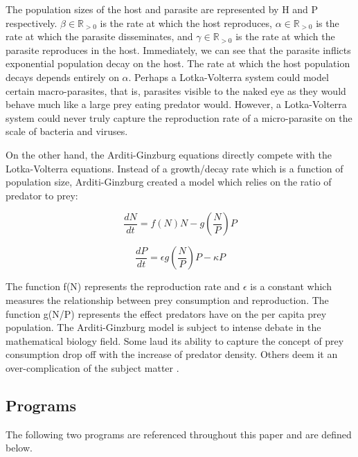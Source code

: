 \documentclass[11pt,a4paper]{scrartcl}
\theoremstyle{definition}
\begin{document}
The population sizes of the host and parasite are represented by H and P respectively. $\beta \in \mathbb{R}_{>0}$ is the rate at which the host reproduces, $\alpha\in \mathbb{R}_{>0}$ is the rate at which the parasite disseminates, and $\gamma \in \mathbb{R}_{>0}$ is the rate at which the parasite reproduces in the host. Immediately, we can see that the parasite inflicts exponential population decay on the host. The rate at which the host population decays depends entirely on $\alpha$. Perhaps a Lotka-Volterra system could model certain macro-parasites, that is, parasites visible to the naked eye as they would behave much like a large prey eating predator would. However, a Lotka-Volterra system could never truly capture the reproduction rate of a micro-parasite on the scale of bacteria and viruses.\newline

On the other hand, the Arditi-Ginzburg equations directly compete with the Lotka-Volterra equations. Instead of a growth/decay rate which is a function of population size, Arditi-Ginzburg created a model which relies on the ratio of predator to prey:

\begin{equation} \label{eq30}
	\frac{dN}{dt}=f(N)N-g(\frac{N}{P})P
\end{equation}

\begin{equation} \label{eq31}
	\frac{dP}{dt}=\epsilon g(\frac{N}{P})P-\kappa P
\end{equation}

The function f(N) represents the reproduction rate and $\epsilon$ is a constant which measures the relationship between prey consumption and reproduction. The function g(N/P) represents the effect predators have on the per capita prey population. The Arditi-Ginzburg model is subject to intense debate in the mathematical biology field. Some laud its ability to capture the concept of prey consumption drop off with the increase of predator density. Others deem it an over-complication of the subject matter \cite{ratio1}.
\subsection{Programs}
The following two programs are referenced throughout this paper and are defined below.
\end{document}
